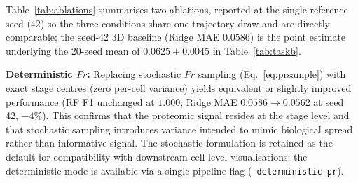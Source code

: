 \documentclass[5p,times,twocolumn]{elsarticle}
\newcommand{\rtag}[1]{}
\newcommand{\rev}[2]{\rtag{#1}#2}
\newcommand{\lang}[1]{#1}
\begin{document}
\begin{table}[!htbp]
  \caption{%
    Sensitivity ablations on state-space design choices,
    reported at the single reference seed (42) so that the
    three conditions are directly comparable under one
    trajectory draw; the ``3D stochastic $Pr$'' row is the
    seed-42 point estimate of the 3D condition tabulated as a
    20-seed mean in Tables~\ref{tab:taskb}--\ref{tab:taskb_perdim}.
    Lower Task B MAE is better.}
  \label{tab:ablations}
  \centering
\end{table}

Table~\ref{tab:ablations} summarises two ablations, reported at
the single reference seed (42) so the three conditions share one
trajectory draw and are directly comparable; the seed-42 3D
baseline (Ridge MAE $0.0586$) is the point estimate underlying
the 20-seed mean of $0.0625 \pm 0.0045$ in
Table~\ref{tab:taskb}.

\textbf{Deterministic $Pr$:}
Replacing stochastic $Pr$ sampling
(\rev{AC}{Eq.~\eqref{eq:prsample}}) with exact stage \lang{centres}
(zero per-cell variance) yields equivalent or slightly improved
performance (RF F1 unchanged at $1.000$; Ridge MAE
$0.0586 \to 0.0562$ at seed 42, $-4\%$).
This confirms that the proteomic signal resides at the stage
level and that stochastic sampling introduces
\lang{variance intended to mimic biological spread} rather than informative signal.
The stochastic formulation is retained as the default for
compatibility with downstream cell-level visualisations; the
deterministic mode is available via a single pipeline flag
(\texttt{--deterministic-pr}).
\end{document}
